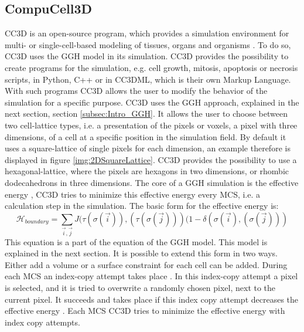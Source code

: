 \subsection{CompuCell3D}
\ac{CC3D} is an open-source program, which provides a simulation environment for multi- or single-cell-based modeling of tissues, organs and organisms \cite{CC3D.org}. To do so, \ac{CC3D} uses the \ac{GGH} model in its simulation. 
CC3D provides the possibility to create programs for the simulation, e.g. cell growth, mitosis, apoptosis or necrosis scripts, in Python, C++ or in CC3DML, which is their own Markup Language. With such programs CC3D allows the user to modify the behavior of the simulation for a specific purpose.
CC3D uses the \ac{GGH} approach, explained in the next section, section \ref{subsec:Intro_GGH}. It allows the user to choose between two cell-lattice types, i.e. a presentation of the pixels or voxels, a pixel with three dimensions, of a cell at a specific position in the simulation field. By default it uses a square-lattice of single pixels for each dimension, an example therefore is displayed in figure \ref{img:2DSquareLattice}. \ac{CC3D} provides the possibility to use a hexagonal-lattice, where the pixels are hexagons in two dimensions, or rhombic dodecahedrons in three dimensions.
The core of a \ac{GGH} simulation is the effective energy \cite{MaciejH.Swat2017}, \ac{CC3D} tries to minimize this effective energy every \ac{MCS}, i.e. a calculation step in the simulation. The basic form for the effective energy is:
\begin{equation}
\mathcal{H}_{boundary} = \sum_{\vec{i},\vec{j}}^{ }{J(\tau(\sigma(\vec{i})),(\tau(\sigma(\vec{j})))(1-\delta(\sigma(\vec{i}),(\sigma(\vec{j})))}
\end{equation}
This equation is a part of the equation of the \ac{GGH} model. This model is explained in the next section. It is possible to extend this form in two ways. Either add a volume or a surface constraint for each cell can be added. 
During each \ac{MCS} an index-copy attempt takes place \cite{MaciejH.Swat2017}. In this index-copy attempt a pixel is selected, and it is tried to overwrite a randomly chosen pixel, next to the current pixel. It succeeds and takes place if this index copy attempt decreases the effective energy \cite{MaciejH.Swat2017}. Each \ac{MCS} \ac{CC3D} tries to minimize the effective energy with index copy attempts. 

